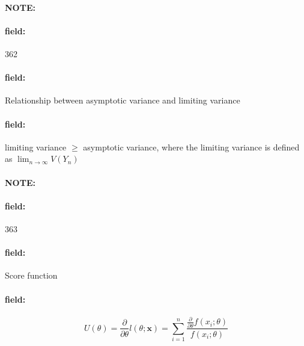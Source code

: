 \documentclass[12pt]{article}
\newenvironment{note}{\paragraph{NOTE:}}{}
\newenvironment{field}{\paragraph{field:}}{}
\begin{document}
\begin{note}
    \begin{field}
        \tiny 362
    \end{field}
    \begin{field}
        Relationship between asymptotic variance and limiting variance
    \end{field}
    \begin{field}
        limiting variance $\geq$ asymptotic variance, where the limiting variance is defined as $\lim_{n \to \infty} V(Y_n)$
    \end{field}
\end{note}

\begin{note}
    \begin{field}
        \tiny 363
    \end{field}
    \begin{field}
        Score function
    \end{field}
    \begin{field}
        $$U(\theta) = \frac{\partial}{\partial \theta} l(\theta;\mathbf{x}) = \sum_{i=1}^n \frac{\frac{\partial}{\partial \theta}f(x_i;\theta)}{f(x_i;\theta)} $$
    \end{field}
\end{note}
\end{document}
